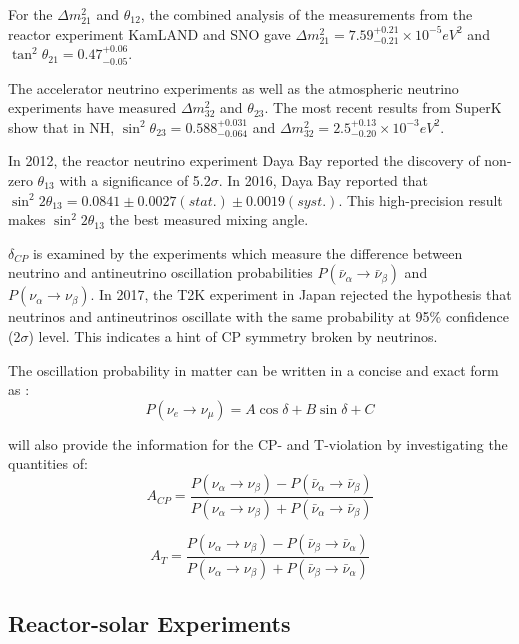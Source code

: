 For the $\Delta m^2_{21}$ and $\theta_{12}$, the combined analysis of the measurements from the reactor experiment KamLAND and SNO gave $\Delta m^2_{21} = 7.59^{+0.21}_{-0.21}\times 10^{-5}eV^2$ and $\tan^2{\theta}_{21}=0.47^{+0.06}_{-0.05}$\cite{kamland_measure}.

The accelerator neutrino experiments as well as the atmospheric neutrino experiments have measured $\Delta m^2_{32}$ and $\theta_{23}$. The most recent results from SuperK show that in NH, $\sin^2\theta_{23}=0.588^{+0.031}_{-0.064}$ and $\Delta m^2_{32} = 2.5^{+0.13}_{-0.20}\times 10^{-3} eV^2$\cite{superk_new}. 

In 2012, the reactor neutrino experiment Daya Bay reported the discovery of non-zero $\theta_{13}$ with a significance of 5.2$\sigma$. In 2016, Daya Bay reported that $\sin^2 2\theta_{13} = 0.0841\pm0.0027(stat.)\pm0.0019(syst.)$. This high-precision result makes $\sin^2 2\theta_{13}$ the best measured mixing angle\cite{dayabayresults,reactorNu}.

$\delta_{CP}$ is examined by the experiments which measure the difference between neutrino and antineutrino oscillation probabilities $P(\bar{\nu}_\alpha\to\bar{\nu}_\beta)$ and $P(\nu_\alpha\to\nu_\beta)$\cite{xing}. In 2017, the T2K experiment in Japan rejected the hypothesis that neutrinos and antineutrinos oscillate with the same probability at 95\% confidence (2$\sigma$) level. This indicates a hint of CP symmetry broken by neutrinos\cite{t2k}.


The oscillation probability in matter can be written in a concise and exact form as \cite{kimura2002exact}:
\[
P(\nu_e\to\nu_\mu) = A\cos\delta+B\sin\delta+C
\]



will also provide the information for the CP- and T-violation
by investigating the quantities of:
\[
A_{CP} = \frac{P(\nu_\alpha\to\nu_\beta)-P(\bar{\nu}_\alpha\to\bar{\nu}_\beta)}{P(\nu_\alpha\to\nu_\beta)+P(\bar{\nu}_\alpha\to\bar{\nu}_\beta)}
\]

\[
A_T = \frac{P(\nu_\alpha\to\nu_\beta)-P(\bar{\nu}_\beta\to\bar{\nu}_\alpha)}{P(\nu_\alpha\to\nu_\beta)+P(\bar{\nu}_\beta\to\bar{\nu}_\alpha)}
\]
 












\subsection{Reactor-solar Experiments}

